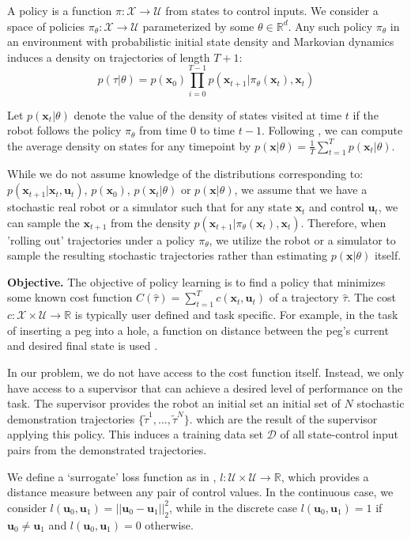\documentclass[10pt, conference]{ieeeconf}      %
\newcommand{\bu}{\mathbf{u}}
\newcommand{\bx}{\mathbf{x}}
\begin{document}
A policy is a function $\pi: \mathcal{X} \to \mathcal{U}$ from states to control inputs. 
We consider a space of policies $\pi_{\theta}:\mathcal{X}\to \mathcal{U}$ parameterized by some $\theta\in \mathbb{R}^d$. Any such policy $\pi_{\theta}$ in an environment with probabilistic initial state density and Markovian dynamics
induces a density on trajectories of length $T+1$: $$p(\tau | \theta)=
p(\bx_0)\prod_{i=0}^{T-1}p(\bx_{t+1}|\pi_{\theta}(\bx_t),\bx_t)$$


Let $p(\bx_t|\theta)$ denote the value of the density of states visited at time $t$ if the robot follows the policy
$\pi_{\theta}$ from time $0$ to time $t-1$.  Following \cite{ross2010reduction}, we can compute
the average density on states for any timepoint by $p(\bx|\theta) = \frac{1}{T} \sum^T_{t=1} p(\bx_t|\theta)$.


While we do not assume knowledge of the distributions corresponding to: $p(\bx_{t+1}|\bx_t,\bu_t)$, $p(\bx_0)$, $p(\bx_t|
\theta)$ or $p(\bx|\theta)$, we assume that we have a stochastic real robot or a simulator such that for any state
$\bx_t$ and control $\bu_t$, we can sample the $\bx_{t+1}$ from the density $p(\bx_{t+1}|\pi_{\theta}(\bx_t),\bx_t)$. 
Therefore, when 'rolling out' trajectories under a policy
$\pi_{\theta}$, we utilize the robot or a simulator to sample the resulting stochastic trajectories rather than
estimating $p(\bx|\theta)$ itself.

\noindent\textbf{Objective.} The objective of  policy learning is to find a policy that minimizes some known cost function $C(\hat{\tau}) = \sum^T_{t=1} c(\bx_t,\bu_t)$ of a trajectory $\hat{\tau}$. The cost $c:\mathcal{X}\times \mathcal{U}\to \mathbb{R}$ is typically user defined and task specific. 
For example, in the task of inserting a peg into a hole, a function on distance between the peg's current and desired final state is used \cite{levine2015end}.  

In our problem, we do not have access to the cost function itself. Instead, we only have access to 
a supervisor that can achieve a desired level of performance on the task. The supervisor provides the robot an initial set
an initial set of $N$ stochastic demonstration trajectories $\lbrace \tilde{\tau}^1,...,\tilde{\tau}^N \rbrace$. 
which are the result of the supervisor applying this policy. This induces a training data set $\mathcal{D}$ of all state-control input pairs from the demonstrated trajectories. 

We define a `surrogate' loss function as in \cite{ross2010reduction}, $l:\mathcal{U}\times \mathcal{U}\to \mathbb{R}$, which provides a distance
measure between any pair of control values. In the continuous case, we consider $l(\bu_0,\bu_1) = ||\bu_0-\bu_1||^2_2$,
while in the discrete case $l(\bu_0,\bu_1) = 1$ if $\bu_0 \neq \bu_1$ and $l(\bu_0, \bu_1)=0$ otherwise.
\end{document}
